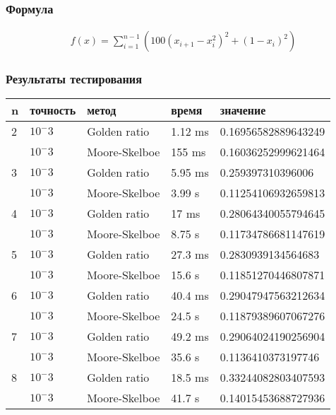     \subsubsection*{Формула}
    \begin{gather*}
        f(x)=\sum_{i=1}^{n-1}\left(100\left(x_{i+1}-x_i^2\right)^2+\left(1-x_i\right)^2\right)
    \end{gather*}

    \subsubsection*{Результаты тестирования}

    \begin{tabular}{ |p{2cm}|p{2cm}|p{3cm}|p{2cm}|p{4cm}|  }
        \hline
        n & точность & метод         & время   & значение            \\
        \hline
        2 & $10^-3$  & Golden ratio  & 1.12 ms & 0.16956582889643249 \\\cline{2-5}
        & $10^-3$  & Moore-Skelboe & 155 ms  & 0.16036252999621464 \\
        \hline
        3 & $10^-3$  & Golden ratio  & 5.95 ms & 0.259397310396006   \\\cline{2-5}
        & $10^-3$  & Moore-Skelboe & 3.99 s  & 0.11254106932659813 \\
        \hline
        4 & $10^-3$  & Golden ratio  & 17 ms   & 0.28064340055794645 \\\cline{2-5}
        & $10^-3$  & Moore-Skelboe & 8.75 s  & 0.11734786681147619 \\
        \hline
        5 & $10^-3$  & Golden ratio  & 27.3 ms & 0.2830939134564683  \\\cline{2-5}
        & $10^-3$  & Moore-Skelboe & 15.6 s  & 0.11851270446807871 \\
        \hline
        6 & $10^-3$  & Golden ratio  & 40.4 ms & 0.29047947563212634 \\\cline{2-5}
        & $10^-3$  & Moore-Skelboe & 24.5 s  & 0.11879389607067276 \\
        \hline
        7 & $10^-3$  & Golden ratio  & 49.2 ms & 0.29064024190256904 \\\cline{2-5}
        & $10^-3$  & Moore-Skelboe & 35.6 s  & 0.1136410373197746  \\
        \hline
        8 & $10^-3$  & Golden ratio  & 18.5 ms & 0.33244082803407593 \\\cline{2-5}
        & $10^-3$  & Moore-Skelboe & 41.7 s  & 0.14015453688727936 \\
        \hline

    \end{tabular}

